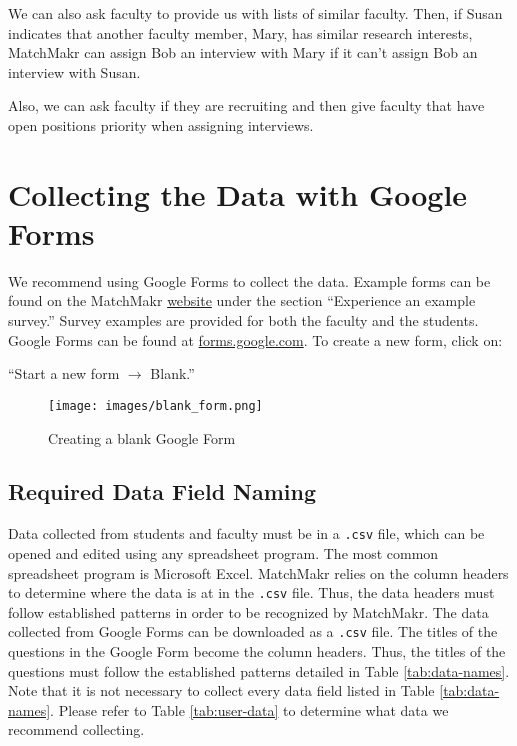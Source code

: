 We can also ask faculty to provide us with lists of similar faculty.  Then, if Susan indicates that another faculty member, Mary, has similar research interests, MatchMakr can assign Bob an interview with Mary if it can't assign Bob an interview with Susan.

Also, we can ask faculty if they are recruiting and then give faculty that have open positions priority when assigning interviews.



\section{Collecting the Data with Google Forms}

We recommend using Google Forms to collect the data.  Example forms can be found on the MatchMakr \href{https://sites.google.com/case.edu/matchmakr/home}{website} under the section ``Experience an example survey.''  Survey examples are provided for both the faculty and the students. Google Forms can be found at \url{forms.google.com}.  To create a new form, click on: \par ``Start a new form $\rightarrow$ Blank.''

\begin{figure}[!h]
	\texttt{[image: images/blank\_form.png]}
	\caption{\label{fig:blank-form} Creating a blank Google Form}
\end{figure}



%
%
\subsection{Required Data Field Naming}
Data collected from students and faculty must be in a \texttt{.csv} file, which can be opened and edited using any spreadsheet program.  The most common spreadsheet program is Microsoft Excel.  MatchMakr relies on the column headers to determine where the data is at in the \texttt{.csv} file.  Thus, the data headers must follow established patterns in order to be recognized by MatchMakr.  The data collected from Google Forms can be downloaded as a \texttt{.csv} file.  The titles of the questions in the Google Form become the column headers.  Thus, the titles of the questions must follow the established patterns detailed in Table \ref{tab:data-names}.  Note that it is not necessary to collect every data field listed in Table \ref{tab:data-names}.  Please refer to Table \ref{tab:user-data} to determine what data we recommend collecting.


